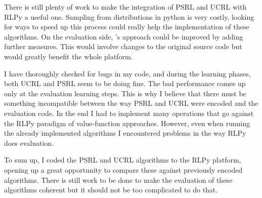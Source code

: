 \documentclass[12pt]{article}
\begin{document}
There is still plenty of work to make the integration of PSRL and UCRL with RLPy a useful one. Sampling from distributions in python is very costly, looking for ways to speed up this process could really help the implementation of these algorithms. On the evaluation side, \cite{RLPy}'s approach could be improved by adding further measures. This would involve changes to the original source code but would greatly benefit the whole platform. 

I have thoroughly checked for bugs in my code, and during the learning phases, both UCRL and PSRL seem to be doing fine. The bad performance comes up only at the evaluation learning steps. This is why I believe that there must be something incompatible between the way PSRL and UCRL were encoded and the evaluation code. In the end I had to implement many operations that go against the RLPy  paradigm of value-function approaches. However, even when running the already implemented algorithms I encountered problems in the way RLPy does evaluation. 

To sum up, I coded the PSRL and UCRL algorithms to the RLPy platform, opening up a great opportunity to compare these against previously encoded algorithms. There is still work to be done to make the evaluation of these algorithms coherent but it should not be too complicated to do that.
\newpage



\end{document}
